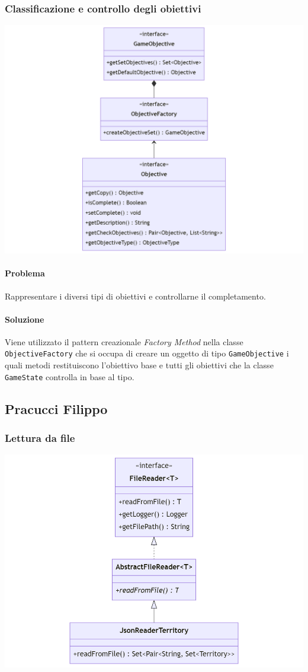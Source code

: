 \documentclass[a4paper,12pt]{report}
\begin{document}
\subsubsection{Classificazione e controllo degli obiettivi}
%
\includegraphics[width=\textwidth]{img/GameObjective.png}
%
\paragraph*{Problema}
Rappresentare i diversi tipi di obiettivi e controllarne il completamento.
%
\paragraph*{Soluzione}
Viene utilizzato il pattern creazionale \textit{Factory Method} nella classe \texttt{ObjectiveFactory} che si occupa di creare un oggetto di tipo \texttt{GameObjective} i quali metodi restituiscono l'obiettivo base e tutti gli obiettivi che la classe \texttt{GameState} controlla in base al tipo.
%
\subsection{Pracucci Filippo}
%
\subsubsection{Lettura da file}
\includegraphics[width=\textwidth]{img/FileReader.png}
\end{document}
